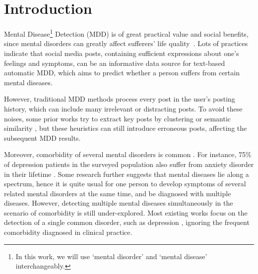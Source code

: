 \section{Introduction}
\label{sec:intro}

Mental Disease\footnote{In this work, we will use `mental disorder' and `mental disease' interchangeably.} 
Detection (MDD) is of great practical value and social benefits, since mental disorders can greatly affect sufferers' life quality~\citep{Dreisbach2019systematic}.  
Lots of practices~\citep{coppersmith2015adhd,mowery2017understanding} indicate that social media posts, containing sufficient expressions about one's feelings and symptoms, can be an informative data source for text-based automatic MDD, which aims to predict whether a person suffers from certain mental diseases.


However, traditional MDD methods \cite{yates2017depression, trotzek2018utilizing} process every post in the user's posting history, which can include many irrelevant or distracting posts. To avoid these noises, some prior works try to extract key posts by clustering \cite{zogan2021depressionnet} or semantic similarity \cite{zhang2022psychiatric}, but these heuristics can still introduce erroneous posts, affecting the subsequent MDD results. 

Moreover, comorbidity of several mental disorders is common \cite{ROCA2009Prevalence}. 
For instance, 75\% of depression patients in the surveyed population also suffer from anxiety disorder in their lifetime \cite{Femke2011Comorbidity}. 
Some research \cite{adam2013mental} further suggests that mental diseases lie along a spectrum, hence it is quite usual for one person to develop symptoms of several related mental disorders at the same time, and be diagnosed with multiple diseases. 
However, detecting multiple mental diseases simultaneously in the scenario of comorbidity is still under-explored. Most existing works focus on the detection of a single common disorder, such as depression \citep{losada2017erisk, lee2021micromodels}, ignoring the frequent comorbidity diagnosed in clinical practice.

